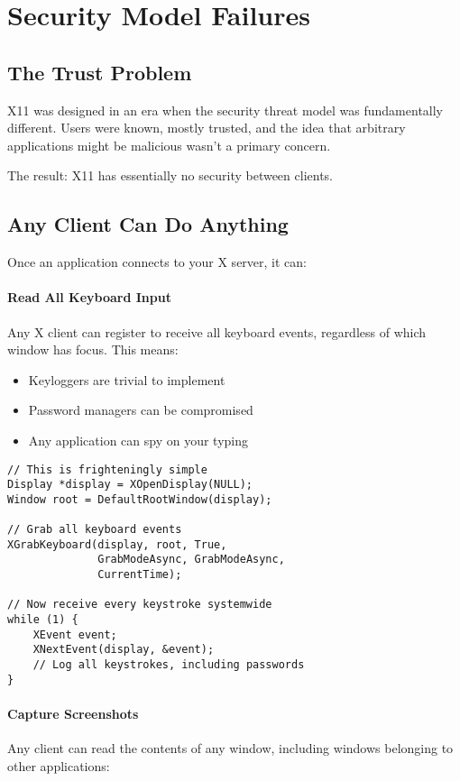 \section{Security Model Failures}

\subsection{The Trust Problem}

X11 was designed in an era when the security threat model was fundamentally different. Users were known, mostly trusted, and the idea that arbitrary applications might be malicious wasn't a primary concern.

The result: X11 has essentially no security between clients.

\subsection{Any Client Can Do Anything}

Once an application connects to your X server, it can:

\paragraph{Read All Keyboard Input}
Any X client can register to receive all keyboard events, regardless of which window has focus. This means:
\begin{itemize}
    \item Keyloggers are trivial to implement
    \item Password managers can be compromised
    \item Any application can spy on your typing
\end{itemize}

\begin{lstlisting}[style=cstyle, caption=Trivial X11 Keylogger]
// This is frighteningly simple
Display *display = XOpenDisplay(NULL);
Window root = DefaultRootWindow(display);

// Grab all keyboard events
XGrabKeyboard(display, root, True,
              GrabModeAsync, GrabModeAsync,
              CurrentTime);

// Now receive every keystroke systemwide
while (1) {
    XEvent event;
    XNextEvent(display, &event);
    // Log all keystrokes, including passwords
}
\end{lstlisting}

\paragraph{Capture Screenshots}
Any client can read the contents of any window, including windows belonging to other applications:

